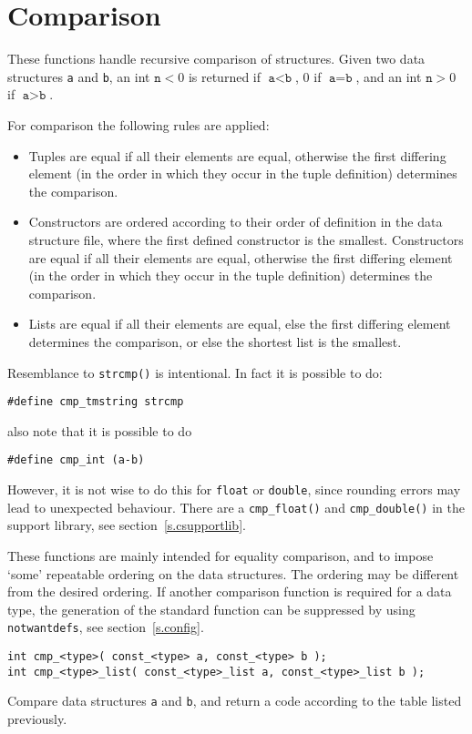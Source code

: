 \section{Comparison}
These functions handle recursive comparison of structures.
Given two data structures \texttt{a} and \texttt{b},
an int $\texttt{n}<0$ is returned if $\texttt{a}<\texttt{b}$,
0 if $\texttt{a}=\texttt{b}$,
and an int $\texttt{n}>0$ if $\texttt{a}>\texttt{b}$.
\par
For comparison the following rules are applied:
\begin{itemize}
\item
Tuples are equal if all their elements are equal,
otherwise the first differing element (in the order in which they occur in
the tuple definition) determines the comparison.
\item
Constructors are ordered according to their order of definition in the
data structure file,
where the first defined constructor is the smallest.
Constructors are equal if all their elements are equal,
otherwise the first differing element (in the order in which they occur
in the tuple definition) determines the comparison.
\item
Lists are equal if all their elements are equal,
else the first differing element determines the comparison,
or else the shortest list is the smallest.
\end{itemize}
\par
Resemblance to \texttt{strcmp()} is intentional. In fact it is possible to do:
\begin{showfile}
\begin{verbatim}
#define cmp_tmstring strcmp
\end{verbatim}
\end{showfile}
also note that it is possible to do
\begin{showfile}
\begin{verbatim}
#define cmp_int (a-b)
\end{verbatim}
\end{showfile}
However, it is not wise to do this for \texttt{float} or \texttt{double},
since rounding errors may lead to unexpected behaviour.
There are a \texttt{cmp\_float()} and \texttt{cmp\_double()} in the support library,
see section~\ref{s.csupportlib}.
\par
These functions are mainly intended for equality comparison,
and to impose `some' repeatable ordering on the data structures.
The ordering may be different from the desired ordering.
If another comparison function is required for a data type,
the generation of the standard function can be suppressed by
using \texttt{notwantdefs}, see section~\ref{s.config}.
\begin{verbatim}
int cmp_<type>( const_<type> a, const_<type> b );
int cmp_<type>_list( const_<type>_list a, const_<type>_list b );
\end{verbatim}
\begin{desc}
Compare data structures \texttt{a} and \texttt{b}, and return a code
according to the table listed previously.
\end{desc}
